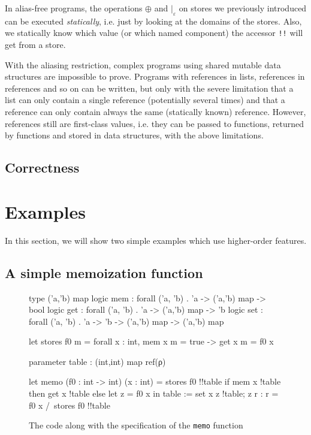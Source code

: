 \documentclass[a4paper]{llncs}
\begin{document}
In alias-free programs, the operations $\oplus$ and $|_ε$ on stores we
previously introduced can be executed {\em statically}, i.e. just by looking
at the domains of the stores. Also, we statically know which value (or which
named component) the accessor {\tt !!} will get from a store. 

With the aliasing restriction, complex programs using shared mutable data
structures are impossible to prove. Programs with references in lists,
references in references and so on can be written, but only with the severe
limitation that a list can only contain a single reference (potentially
several times) and that a reference can only contain always the same
(statically known) reference. However, references still are first-class
values, i.e. they can be passed to functions, returned by functions and stored
in data structures, with the above limitations.

\subsection{Correctness}

\section{Examples}
\label{sec:examples}

In this section, we will show two simple examples which use higher-order
features.

\subsection{A simple memoization function}

\begin{figure}[tpb]
\begin{who}
type ('a,'b) map
logic mem : forall ('a, 'b) . 'a -> ('a,'b) map -> bool
logic get : forall ('a, 'b) . 'a -> ('a,'b) map -> 'b
logic set : forall ('a, 'b) . 'a -> 'b -> ('a,'b) map -> ('a,'b) map

let stores f0 m =
  forall x : int, mem x m = true -> get x m = f0 x

parameter table : (int,int) map ref(ρ)

let memo (f0 : int -> int) (x : int) = 
  {stores f0 !!table}
  if mem x !table then get x !table
  else
    let z = f0 x in
    table := set x z !table;
    z
  {r : r = f0 x /\ stores f0 !!table}
\end{who}
  \caption{The code along with the specification of the {\tt memo} function}
  \label{fig:memo}
\end{figure}
\end{document}
